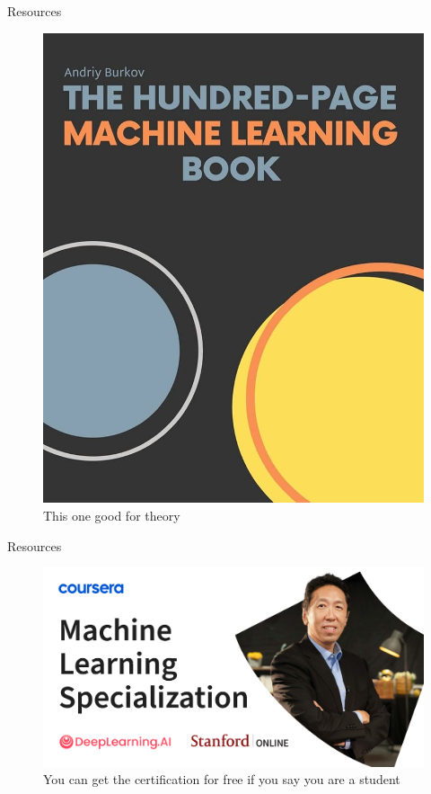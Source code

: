 \documentclass{beamer}
\begin{document}
\begin{frame}{Resources}
\begin{figure}
\begin{minipage}{0.45\linewidth}
            \includegraphics[width=\linewidth]{imgs/ml.jpg}
            \caption{This one good for theory}
        \end{minipage}
    \end{figure}
\end{frame}

\begin{frame}{Resources}
\begin{figure}
    \centering
    \includegraphics[width=0.8\linewidth]{imgs/andrew_ng.png}
    \caption{You can get the certification for free if you say you are a student}
\end{figure}
\end{frame}
\end{document}
